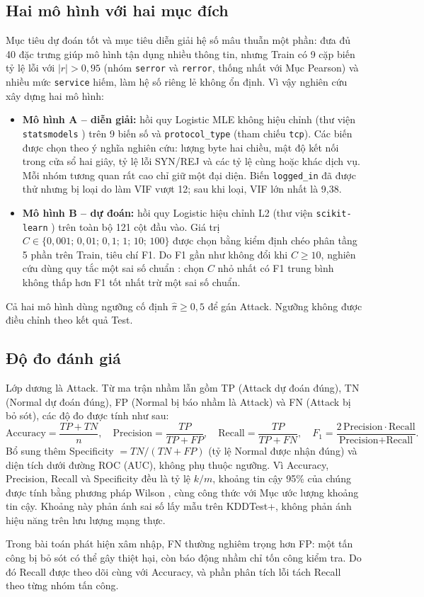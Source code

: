 \subsection{Hai mô hình với hai mục đích}
Mục tiêu dự đoán tốt và mục tiêu diễn giải hệ số mâu thuẫn một phần: đưa đủ 40 đặc trưng giúp mô hình tận dụng nhiều thông tin, nhưng Train có 9 cặp biến tỷ lệ lỗi với $|r|>0{,}95$ (nhóm \texttt{serror} và \texttt{rerror}, thống nhất với Mục Pearson) và nhiều mức \texttt{service} hiếm, làm hệ số riêng lẻ không ổn định. Vì vậy nghiên cứu xây dựng hai mô hình:
\begin{itemize}[leftmargin=1.2cm,itemsep=2pt]
\item \textbf{Mô hình A -- diễn giải:} hồi quy Logistic MLE không hiệu chỉnh (thư viện \texttt{statsmodels} \cite{task4_statsmodels2010}) trên 9 biến số và \texttt{protocol\_type} (tham chiếu \texttt{tcp}). Các biến được chọn theo ý nghĩa nghiên cứu: lượng byte hai chiều, mật độ kết nối trong cửa sổ hai giây, tỷ lệ lỗi SYN/REJ và các tỷ lệ cùng hoặc khác dịch vụ. Mỗi nhóm tương quan rất cao chỉ giữ một đại diện. Biến \texttt{logged\_in} đã được thử nhưng bị loại do làm VIF vượt 12; sau khi loại, VIF lớn nhất là 9,38.
\item \textbf{Mô hình B -- dự đoán:} hồi quy Logistic hiệu chỉnh L2 (thư viện \texttt{scikit-learn} \cite{task4_sklearn2011}) trên toàn bộ 121 cột đầu vào. Giá trị $C\in\{0{,}001;\,0{,}01;\,0{,}1;\,1;\,10;\,100\}$ được chọn bằng kiểm định chéo phân tầng 5 phần trên Train, tiêu chí F1. Do F1 gần như không đổi khi $C\geq10$, nghiên cứu dùng quy tắc một sai số chuẩn \cite{task4_hastie2009}: chọn $C$ nhỏ nhất có F1 trung bình không thấp hơn F1 tốt nhất trừ một sai số chuẩn.
\end{itemize}
Cả hai mô hình dùng ngưỡng cố định $\hat\pi\geq0{,}5$ để gán Attack. Ngưỡng không được điều chỉnh theo kết quả Test.

\subsection{Độ đo đánh giá}
Lớp dương là Attack. Từ ma trận nhầm lẫn gồm TP (Attack dự đoán đúng), TN (Normal dự đoán đúng), FP (Normal bị báo nhầm là Attack) và FN (Attack bị bỏ sót), các độ đo được tính như sau:
\begin{equation}
\text{Accuracy}=\frac{TP+TN}{n},\quad
\text{Precision}=\frac{TP}{TP+FP},\quad
\text{Recall}=\frac{TP}{TP+FN},\quad
F_1=\frac{2\,\text{Precision}\cdot\text{Recall}}{\text{Precision}+\text{Recall}}.
\label{eq:t4:metrics}
\end{equation}
Bổ sung thêm Specificity $=TN/(TN+FP)$ (tỷ lệ Normal được nhận đúng) và diện tích dưới đường ROC (AUC), không phụ thuộc ngưỡng. Vì Accuracy, Precision, Recall và Specificity đều là tỷ lệ $k/m$, khoảng tin cậy 95\% của chúng được tính bằng phương pháp Wilson \cite{task4_wilson1927}, cùng công thức với Mục ước lượng khoảng tin cậy. Khoảng này phản ánh sai số lấy mẫu trên KDDTest+, không phản ánh hiệu năng trên lưu lượng mạng thực.

Trong bài toán phát hiện xâm nhập, FN thường nghiêm trọng hơn FP: một tấn công bị bỏ sót có thể gây thiệt hại, còn báo động nhầm chỉ tốn công kiểm tra. Do đó Recall được theo dõi cùng với Accuracy, và phần phân tích lỗi tách Recall theo từng nhóm tấn công.
\FloatBarrier
